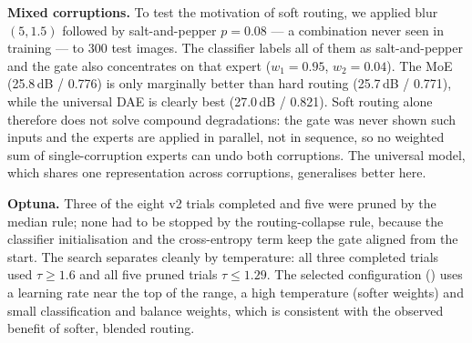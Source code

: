 \textbf{Mixed corruptions.} To test the motivation of soft routing, we applied blur $(5,1.5)$ followed by salt-and-pepper $p=0.08$ --- a combination never seen in training --- to 300 test images. The classifier labels all of them as salt-and-pepper and the gate also concentrates on that expert ($w_1=0.95$, $w_2=0.04$). The MoE (25.8\,dB / 0.776) is only marginally better than hard routing (25.7\,dB / 0.771), while the universal DAE is clearly best (27.0\,dB / 0.821). Soft routing alone therefore does not solve compound degradations: the gate was never shown such inputs and the experts are applied in parallel, not in sequence, so no weighted sum of single-corruption experts can undo both corruptions. The universal model, which shares one representation across corruptions, generalises better here.

\textbf{Optuna.} Three of the eight v2 trials completed and five were pruned by the median rule; none had to be stopped by the routing-collapse rule, because the classifier initialisation and the cross-entropy term keep the gate aligned from the start. The search separates cleanly by temperature: all three completed trials used $\tau\ge1.6$ and all five pruned trials $\tau\le1.29$. The selected configuration (\MOEBESTPARAMS) uses a learning rate near the top of the range, a high temperature (softer weights) and small classification and balance weights, which is consistent with the observed benefit of softer, blended routing.
